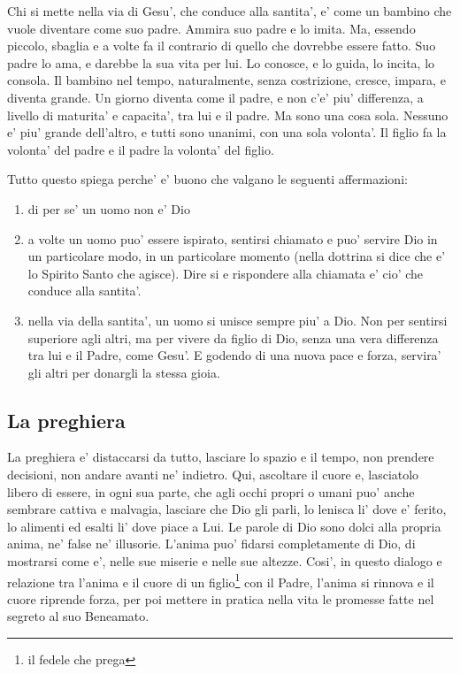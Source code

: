 Chi si mette nella via di Gesu', che conduce alla santita', e' come un bambino che vuole diventare come suo padre. Ammira suo padre e lo imita. Ma, essendo piccolo, sbaglia e a volte fa il contrario di quello che dovrebbe essere fatto. Suo padre lo ama, e darebbe la sua vita per lui. Lo conosce, e lo guida, lo incita, lo consola. Il bambino nel tempo, naturalmente, senza costrizione, cresce, impara, e diventa grande. Un giorno diventa come il padre, e non c'e' piu' differenza, a livello di maturita' e capacita', tra lui e il padre. Ma sono una cosa sola. Nessuno e' piu' grande dell'altro, e tutti sono unanimi, con una sola volonta'. Il figlio fa la volonta' del padre e il padre la volonta' del figlio.

Tutto questo spiega perche' e' buono che valgano le seguenti affermazioni:
\begin{enumerate}
    \item di per se' un uomo non e' Dio
    \item a volte un uomo puo' essere ispirato, sentirsi chiamato e puo' servire Dio in un particolare modo, in un particolare momento (nella dottrina si dice che e' lo Spirito Santo che agisce). Dire si e rispondere alla chiamata e' cio' che conduce alla santita'.
    \item nella via della santita', un uomo si unisce sempre piu' a Dio. Non per sentirsi superiore agli altri, ma per vivere da figlio di Dio, senza una vera differenza tra lui e il Padre, come Gesu'. E godendo di una nuova pace e forza, servira' gli altri per donargli la stessa gioia.
\end{enumerate}


\subsection{La preghiera}
La preghiera e' distaccarsi da tutto, lasciare lo spazio e il tempo, non prendere decisioni, non andare avanti ne' indietro. Qui, ascoltare il cuore e, lasciatolo libero di essere, in ogni sua parte, che agli occhi propri o umani puo' anche sembrare cattiva e malvagia, lasciare che Dio gli parli, lo lenisca li' dove e' ferito, lo alimenti ed esalti li' dove piace a Lui. Le parole di Dio sono dolci alla propria anima, ne' false ne' illusorie. L'anima puo' fidarsi completamente di Dio, di mostrarsi come e', nelle sue miserie e nelle sue altezze. Cosi', in questo dialogo e relazione tra l'anima e il cuore di un figlio\footnote{il fedele che prega} con il Padre, l'anima si rinnova e il cuore riprende forza, per poi mettere in pratica nella vita le promesse fatte nel segreto al suo Beneamato.

